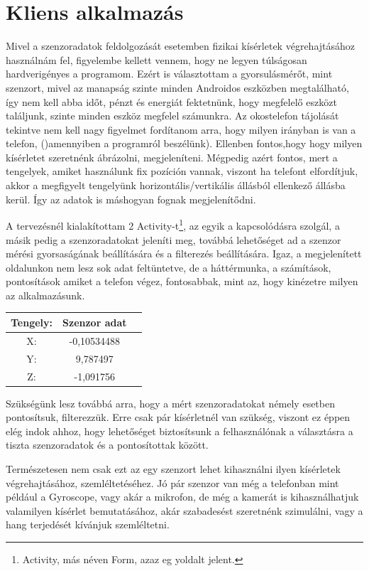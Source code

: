 \documentclass{thesis-ekf}
\theoremstyle{definition}
\theoremstyle{remark}
\begin{document}
\section{Kliens alkalmazás}
Mivel a szenzoradatok feldolgozását esetemben fizikai kísérletek végrehajtásához használnám fel, figyelembe kellett vennem, hogy ne legyen túlságosan hardverigényes a programom. Ezért is választottam a gyorsulásmérőt, mint szenzort, mivel az manapság szinte minden Androidos eszközben megtalálható, így nem kell abba időt, pénzt és energiát fektetnünk, hogy megfelelő eszközt találjunk, szinte minden eszköz megfelel számunkra. Az okostelefon tájolását tekintve nem kell nagy figyelmet fordítanom arra, hogy milyen irányban is van a telefon, ()amennyiben a programról beszélünk). Ellenben fontos,hogy hogy milyen kísérletet szeretnénk ábrázolni, megjeleníteni. Mégpedig azért fontos, mert a tengelyek, amiket használunk fix pozíción vannak, viszont ha telefont elfordítjuk, akkor a megfigyelt tengelyünk horizontális/vertikális állásból ellenkező állásba kerül. Így az adatok is máshogyan fognak megjelenítődni.
\par A tervezésnél kialakítottam 2 Activity-t\footnote{Activity, más néven Form, azaz eg yoldalt jelent.}, az egyik a kapcsolódásra szolgál, a másik pedig a szenzoradatokat jeleníti meg, továbbá lehetőséget ad a szenzor mérési gyorsaságának beállítására és a filterezés beállítására. Igaz, a megjelenített oldalunkon nem lesz sok adat feltüntetve, de a háttérmunka, a számítások, pontosítások amiket a telefon végez, fontosabbak, mint az, hogy kinézetre milyen az alkalmazásunk.
\begin{center}
	\begin{tabular}{ |c|c|c| } 
		\hline
		Tengely: & Szenzor adat \\
		\hline\hline
		X: & -0,10534488  \\
		\hline
		Y: & 9,787497 \\
		\hline
		Z: & -1,091756 \\
		\hline
	\end{tabular}
\end{center}
\par Szükségünk lesz továbbá arra, hogy a mért szenzoradatokat némely esetben pontosítsuk, filterezzük. Erre csak pár kísérletnél van szükség, viszont ez éppen elég indok ahhoz, hogy lehetőséget biztosítsunk a felhasználónak a választásra a tiszta szenzoradatok és a pontosítottak között.
\par Természetesen nem csak ezt az egy szenzort lehet kihasználni ilyen kísérletek végrehajtásához, szemléltetéséhez. Jó pár szenzor van még a telefonban mint például a Gyroscope, vagy akár a mikrofon, de még a kamerát is kihasználhatjuk valamilyen kísérlet bemutatásához, akár szabadesést szeretnénk szimulálni, vagy a hang terjedését kívánjuk szemléltetni.
\end{document}
